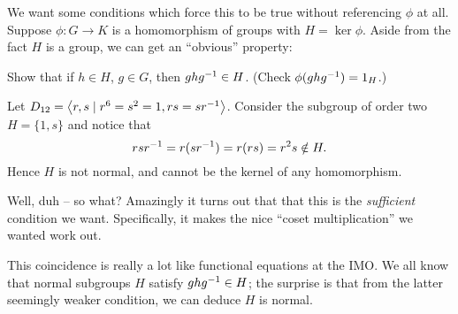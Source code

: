 We want some conditions which force this to be true without referencing $\phi$ at all.
Suppose $\phi : G \to K$ is a homomorphism of groups with $H = \ker\phi$.
Aside from the fact $H$ is a group, we can get an ``obvious'' property:
\begin{ques}
	Show that if $h \in H$, $g \in G$,
	then $ghg^{-1} \in H$.
	(Check $\phi(ghg^{-1}) = 1_H$.)
\end{ques}
\begin{example}
	Let $D_{12} = \left<r,s \mid r^6=s^2=1, rs=sr^{-1}\right>$.
	Consider the subgroup of order two $H = \{1,s\}$
	and notice that \[ rsr^{-1} = r(sr^{-1})= r(rs) = r^2s \notin H. \]
	Hence $H$ is not normal, and cannot be the kernel of any homomorphism.
\end{example}
Well, duh -- so what?
Amazingly it turns out that that this is the \emph{sufficient} condition we want.
Specifically, it makes the nice ``coset multiplication'' we wanted work out.
\begin{remark}
	This coincidence is really a lot like functional equations at the IMO.
	We all know that normal subgroups $H$ satisfy $ghg^{-1} \in H$;
	the surprise is that from the latter seemingly weaker condition,
	we can deduce $H$ is normal.
\end{remark}


